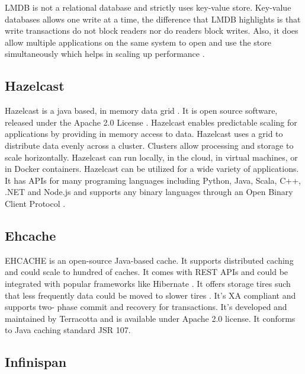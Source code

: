      LMDB is not a relational database \cite{www-relationaldb} and
     strictly uses key-value store. Key-value databases allows one
     write at a time, the difference that LMDB highlights is that
     write transactions do not block readers nor do readers block
     writes. Also, it does allow multiple applications on the same
     system to open and use the store simultaneously which helps in
     scaling up performance \cite{www-lmdb}.

\subsection{Hazelcast}

     Hazelcast is a java based, in memory data grid
     \cite{www-wikihazel}.  It is open source software, released
     under the Apache 2.0 License \cite{www-githubhazel}. Hazelcast
     enables predictable scaling for applications by providing in
     memory access to data.  Hazelcast uses a grid to distribute data
     evenly across a cluster. Clusters allow processing and storage to
     scale horizontally. Hazelcast can run locally, in the cloud, in
     virtual machines, or in Docker containers. Hazelcast can be
     utilized for a wide variety of applications. It has APIs for many
     programing languages including Python, Java, Scala, C++, .NET and
     Node.js and supports any binary languages through an Open Binary
     Client Protocol \cite{www-wikihazel}.

\subsection{Ehcache}

     EHCACHE is an open-source Java-based cache. It supports
     distributed caching and could scale to hundred of caches. It
     comes with REST APIs and could be integrated with popular
     frameworks like Hibernate \cite{www-ehcache-features}. It offers
     storage tires such that less frequently data could be moved to
     slower tires \cite{www-ehcache-documentation}. It's XA compliant
     and supports two- phase commit and recovery for
     transactions. It's developed and maintained by Terracotta and is
     available under Apache 2.0 license.  It conforms to Java caching
     standard JSR 107.

\subsection{Infinispan}

